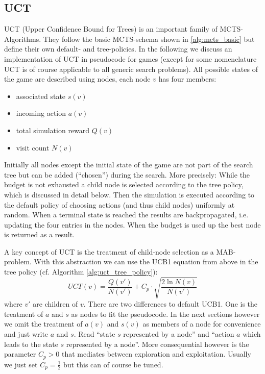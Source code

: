 \subsection{UCT}
\label{ss:uct}
UCT (Upper Confidence Bound for Trees) is an important family of MCTS-Algorithms. They follow the basic MCTS-schema shown in \ref{alg:mcts_basic} but define their own default- and tree-policies. In the following we discuss an implementation of UCT in pseudocode for games (except for some nomenclature UCT is of course applicable to all generic search problems). All possible states of the game are described using nodes, each node $v$ has four members:
\begin{itemize}
    \item associated state $s(v)$
    \item incoming action $a(v)$
    \item total simulation reward $Q(v)$
    \item visit count $N(v)$
\end{itemize} Initially all nodes except the initial state of the game are not part of the search tree but can be added (\enquote{chosen}) during the search. More precisely: While the budget is not exhausted a child node is selected according to the tree policy, which is discussed in detail below. Then the simulation is executed according to the default policy of choosing actions (and thus child nodes) uniformly at random. When a terminal state is reached the results are backpropagated, i.e. updating the four entries in the nodes. When the budget is used up the best node is returned as a result.

A key concept of UCT is the treatment of child-node selection as a MAB-problem. With this abstraction we can use the UCB1 equation from above in the tree policy (cf. Algorithm \ref{alg:uct_tree_policy}):
\begin{equation}
    UCT(v) = \frac{Q(v')}{N(v')}+C_p \cdot \sqrt{\frac{2 \ln N(v)}{N(v')}}
\end{equation} where $v'$ are children of $v$. There are two differences to default UCB1. One is the treatment of $a$ and $s$ as nodes to fit the pseudocode. In the next sections however we omit the treatment of $a(v)$ and $s(v)$ as members of a node for convenience and just write $a$ and $s$. Read \enquote{state $s$ represented by a node} and \enquote{action $a$ which leads to the state $s$ represented by a node}. More consequential however is the parameter $C_p > 0$ that mediates between exploration and exploitation. Usually we just set $C_p = \frac{1}{2} $ but this can of course be tuned. 

